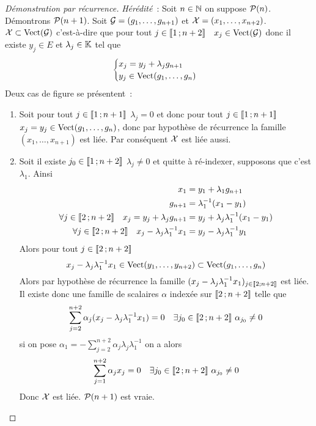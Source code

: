 \begin{proof}[Démonstration par récurrence]
  \emph{Hérédité}~: Soit \(n \in \N\) on suppose \(\P(n)\). Démontrons \(\P(n+1)\). Soit \(\G=(g_1, \ldots, g_{n+1})\) et \(\X=(x_1, \ldots, x_{n+2})\). \(\X \subset \VectEngendre(\G)\) c'est-à-dire que pour tout \(j \in \intervalleentier{1}{n+2} \quad x_j \in \VectEngendre(\G)\) donc il existe \(y_j \in E\) et \(\lambda_j \in \K\) tel que
  \begin{equation}
    \begin{cases} x_j = y_j + \lambda_j g_{n+1} \\ y_j \in \VectEngendre(g_1, \ldots, g_n) \end{cases}
  \end{equation}
  Deux cas de figure se présentent~:
  \begin{enumerate}
  \item Soit pour tout \(j \in \intervalleentier{1}{n+1}\) \(\lambda_j=0\) et donc pour tout \(j \in \intervalleentier{1}{n+1}\) \(x_j=y_j \in \VectEngendre(g_1, \ldots, g_n)\), donc par hypothèse de récurrence la famille \((x_1, \ldots, x_{n+1})\) est liée. Par conséquent \(\X\) est liée aussi.
  \item Soit il existe \(j_0 \in \intervalleentier{1}{n+2}\) \(\lambda_j \neq 0\) et quitte à ré-indexer, supposons que c'est \(\lambda_1\). Ainsi
    \begin{align}
      x_1 &= y_1 + \lambda_1 g_{n+1} \\
      g_{n+1} &= \lambda_1^{-1}(x_1-y_1) \\
      \forall j \in \intervalleentier{2}{n+2} \quad x_j = y_j + \lambda_j g_{n+1} &= y_j + \lambda_j \lambda_1^{-1}(x_1-y_1)\\
      \forall j \in \intervalleentier{2}{n+2} \quad x_j - \lambda_j\lambda_1^{-1}x_1 &= y_j - \lambda_j \lambda_1^{-1} y_1
    \end{align}
    Alors pour tout \(j \in \intervalleentier{2}{n+2}\)
    \begin{equation}
      x_j - \lambda_j\lambda_1^{-1}x_1 \in \VectEngendre(y_1, \ldots, y_{n+2}) \subset \VectEngendre(g_1, \ldots, g_n)
    \end{equation}
    Alors par hypothèse de récurrence la famille \((x_j-\lambda_j\lambda_1^{-1}x_1)_{j \in \intervalleentier{2}{n+2}}\) est liée. Il existe donc une famille de scalaires \(\alpha\) indexée sur \(\intervalleentier{2}{n+2}\) telle que
    \begin{equation}
      \sum_{j=2}^{n+2} \alpha_j (x_j-\lambda_j\lambda_1^{-1}x_1) = 0 \quad \exists j_0 \in \intervalleentier{2}{n+2} \ \alpha_{j_0} \neq 0
    \end{equation}
    si on pose \(\alpha_1=-\sum_{j=2}^{n+2} \alpha_j \lambda_j \lambda_1^{-1}\) on a alors
    \begin{equation}
      \sum_{j=1}^{n+2} \alpha_j x_j =0 \quad \exists j_0 \in \intervalleentier{2}{n+2} \ \alpha_{j_0} \neq 0
    \end{equation}
    Donc \(\X\) est liée. \(\P(n+1)\) est vraie.
  \end{enumerate}


\end{proof}
